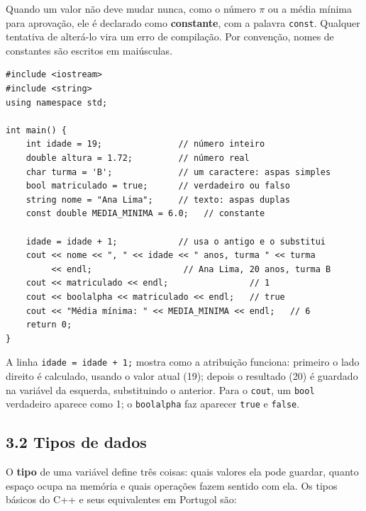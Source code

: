 Quando um valor não deve mudar nunca, como o número $\pi$ ou a média mínima para aprovação, ele é declarado como \textbf{constante}, com a palavra \texttt{const}. Qualquer tentativa de alterá-lo vira um erro de compilação. Por convenção, nomes de constantes são escritos em maiúsculas.

\begin{codigo}
\begin{Verbatim}[breaklines=true, breaksymbolleft={}, fontsize=\footnotesize]
#include <iostream>
#include <string>
using namespace std;

int main() {
    int idade = 19;               // número inteiro
    double altura = 1.72;         // número real
    char turma = 'B';             // um caractere: aspas simples
    bool matriculado = true;      // verdadeiro ou falso
    string nome = "Ana Lima";     // texto: aspas duplas
    const double MEDIA_MINIMA = 6.0;   // constante

    idade = idade + 1;            // usa o antigo e o substitui
    cout << nome << ", " << idade << " anos, turma " << turma
         << endl;                  // Ana Lima, 20 anos, turma B
    cout << matriculado << endl;                // 1
    cout << boolalpha << matriculado << endl;   // true
    cout << "Média mínima: " << MEDIA_MINIMA << endl;   // 6
    return 0;
}
\end{Verbatim}
\end{codigo}

A linha \texttt{idade = idade + 1;} mostra como a atribuição funciona: primeiro o lado direito é calculado, usando o valor atual (19); depois o resultado (20) é guardado na variável da esquerda, substituindo o anterior. Para o \texttt{cout}, um \texttt{bool} verdadeiro aparece como 1; o \texttt{boolalpha} faz aparecer \texttt{true} e \texttt{false}.

\subsection{3.2 Tipos de dados}

O \textbf{tipo} de uma variável define três coisas: quais valores ela pode guardar, quanto espaço ocupa na memória e quais operações fazem sentido com ela. Os tipos básicos do C++ e seus equivalentes em Portugol são:

